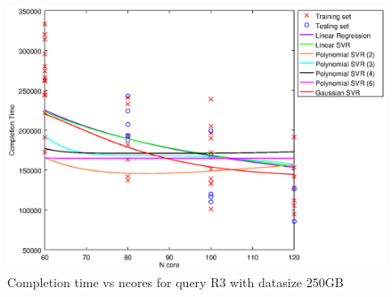 
\begin {figure}[hbtp]
\centering
\includegraphics[width=\textwidth]{output/R3_250_1_OVER_NCORES/plot_R3_250.eps}
\caption{Completion time vs ncores for query R3 with datasize 250GB}
\label{fig:all_nonlinear_R3_250}
\end {figure}
